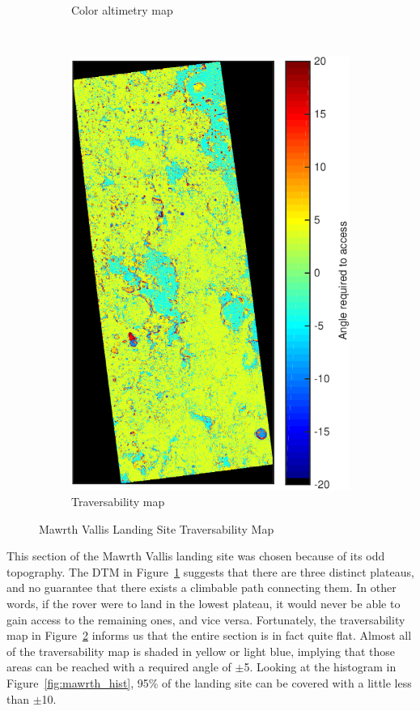 \documentclass[12pt]{article}
\begin{document}
\begin{figure}[h!]
\begin{subfigure}[t]{0.43\textwidth}
    \caption{Color altimetry map}
    \label{fig:mawrth_dtm}
  \end{subfigure}
  ~
  \begin{subfigure}[t]{0.43\textwidth}
    \centering
    \includegraphics[height=0.5\paperheight]{figures/maps/ESP_015985_2040/DTEEC_015985_2040_016262_2040_U01-traversability_map.pdf}
    \caption{Traversability map}
    \label{fig:mawrth_traversability}
  \end{subfigure}
  \caption{Mawrth Vallis Landing Site Traversability Map}
  \label{fig:mawrth}
\end{figure}
\par This section of the Mawrth Vallis landing site was chosen because of its odd topography. The DTM in Figure~\ref{fig:mawrth_dtm} suggests that there are three distinct plateaus, and no guarantee that there exists a climbable path connecting them. In other words, if the rover were to land in the lowest plateau, it would never be able to gain access to the remaining ones, and vice versa. Fortunately, the traversability map in Figure~\ref{fig:mawrth_traversability} informs us that the entire section is in fact quite flat. Almost all of the traversability map is shaded in yellow or light blue, implying that those areas can be reached with a required angle of $\pm$5\textdegree. Looking at the histogram in Figure~\ref{fig:mawrth_hist}, 95\% of the landing site can be covered with a little less than $\pm$10\textdegree.
\end{document}
